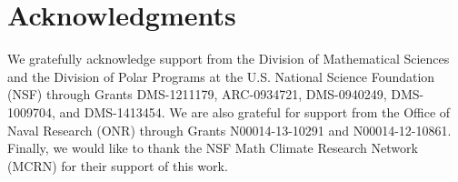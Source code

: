 \documentclass[amsa]{ipart}
\begin{document}









\medskip

\section*{Acknowledgments}
We gratefully acknowledge support from the Division of Mathematical
  Sciences and the Division of Polar Programs at the U.S. National
  Science Foundation (NSF) through Grants DMS-1211179, 
  ARC-0934721, DMS-0940249, DMS-1009704, and DMS-1413454. 
  We are also grateful for support from
  the Office of Naval Research (ONR) through Grants N00014-13-10291 and
  N00014-12-10861. Finally, we would like to thank the NSF Math Climate
  Research Network (MCRN) for their support of this work. 

\medskip




%


\end{document}
